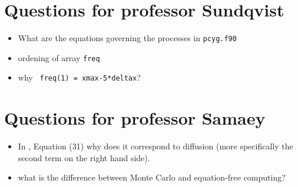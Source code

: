 \documentclass[../main/main.tex]{subfiles}
\begin{document}
\section{Questions for professor Sundqvist}
\begin{itemize}
\item What are the equations governing the processes in \texttt{pcyg.f90} 
\item ordening of array \texttt{freq} 
\item why \texttt{ freq(1) = xmax-5*deltax}?
\end{itemize}

\section{Questions for professor Samaey}
\begin{itemize}
\item In \cite{Dimarco2018}, Equation (31) why does it correspond to diffusion (more specifically the second term on the right hand side).
\item what is the difference between Monte Carlo and equation-free computing?
\end{itemize}

\newpage
\end{document}
